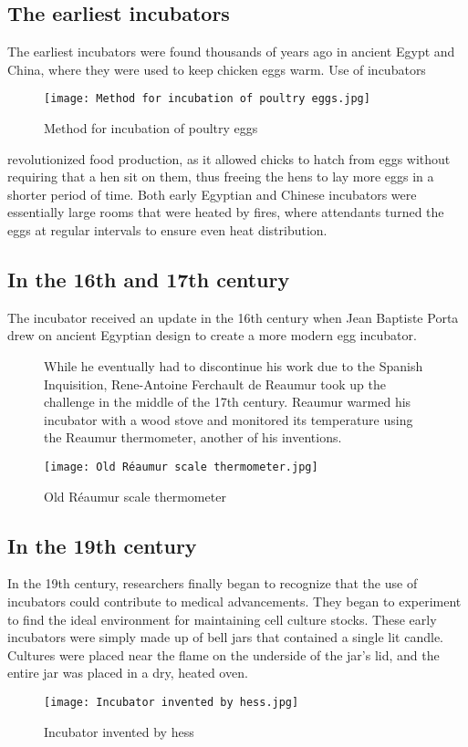 \documentclass[11pt]{article}
\begin{document}
\subsection{The earliest incubators}
\raggedright The earliest incubators were found thousands of years ago in ancient Egypt and China, where they were used to keep chicken eggs warm. Use of incubators
\begin{figure}[h]
\centering
\texttt{[image: Method for incubation of poultry eggs.jpg]}
\caption{Method for incubation of poultry eggs}
\end{figure} 
\raggedright revolutionized food production, as it allowed chicks to hatch from eggs without requiring that a hen sit on them, thus freeing the hens to lay more eggs in a shorter period of time. Both early Egyptian and Chinese incubators were essentially large rooms that were heated by fires, where attendants turned the eggs at regular intervals to ensure even heat distribution.
\raggedright
\subsection{In the 16th and 17th century}
The incubator received an update in the 16th century when Jean Baptiste Porta drew on ancient Egyptian design to create a more modern egg incubator.
\begin{figure}[h]


 \raggedright \Large While he eventually had to discontinue his work due to the Spanish Inquisition, Rene-Antoine Ferchault de Reaumur took up the challenge in the middle of the 17th century. Reaumur warmed his incubator with a wood stove and monitored its temperature using the Reaumur thermometer, another of his inventions.
 
 \centering
\texttt{[image: Old Réaumur scale thermometer.jpg]}
\caption{Old Réaumur scale thermometer}
\end{figure}
\raggedright
\subsection{In the 19th century}
\raggedright In the 19th century, researchers finally began to recognize that the use of incubators could contribute to medical advancements. They began to experiment to find the ideal environment for maintaining cell culture stocks. These early incubators were simply made up of bell jars that contained a single lit candle. Cultures were placed near the flame on the underside of the jar's lid, and the entire jar was placed in a dry, heated oven.
\begin{figure}[h]
\centering
\texttt{[image: Incubator invented by hess.jpg]}
\caption{Incubator invented by hess}
\end{figure}
\end{document}
